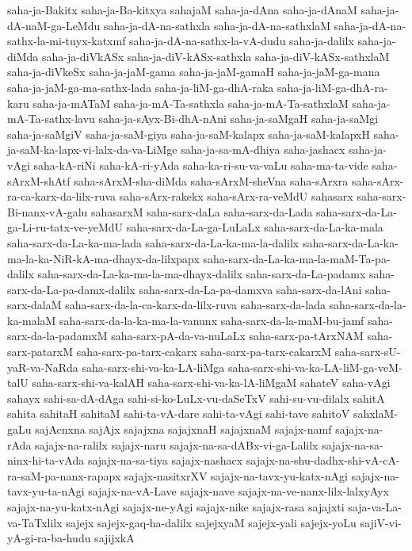 {saha-ja-Bakitx
saha-ja-Ba-kitxya
sahajaM
saha-ja-dAna
saha-ja-dAnaM
saha-ja-dA-naM-ga-LeMdu
saha-ja-dA-na-sathxla
saha-ja-dA-na-sathxlaM
saha-ja-dA-na-sathx-la-mi-tuyx-katxmf
saha-ja-dA-na-sathx-la-vA-dudu
saha-ja-dalilx
saha-ja-diMda
saha-ja-diVkASx
saha-ja-diV-kASx-sathxla
saha-ja-diV-kASx-sathxlaM
saha-ja-diVkeSx
saha-ja-jaM-gama
saha-ja-jaM-gamaH
saha-ja-jaM-ga-mana
saha-ja-jaM-ga-ma-sathx-lada
saha-ja-liM-ga-dhA-raka
saha-ja-liM-ga-dhA-ra-karu
saha-ja-mATaM
saha-ja-mA-Ta-sathxla
saha-ja-mA-Ta-sathxlaM
saha-ja-mA-Ta-sathx-lavu
saha-ja-sAyx-Bi-dhA-nAni
saha-ja-saMgaH
saha-ja-saMgi
saha-ja-saMgiV
saha-ja-saM-giya
saha-ja-saM-kalapx
saha-ja-saM-kalapxH
saha-ja-saM-ka-lapx-vi-lalx-da-va-LiMge
saha-ja-sa-mA-dhiya
saha-jashacx
saha-ja-vAgi
saha-kA-riNi
saha-kA-ri-yAda
saha-ka-ri-su-va-vaLu
saha-ma-ta-vide
saha-sArxM-shAtf
saha-sArxM-sha-diMda
saha-sArxM-sheVna
saha-sArxra
saha-sArx-ra-ca-karx-da-lilx-ruva
saha-sArx-rakekx
saha-sArx-ra-veMdU
sahasarx
saha-sarx-Bi-nanx-vA-galu
sahasarxM
saha-sarx-daLa
saha-sarx-da-Lada
saha-sarx-da-La-ga-Li-ru-tatx-ve-yeMdU
saha-sarx-da-La-ga-LuLaLx
saha-sarx-da-La-ka-mala
saha-sarx-da-La-ka-ma-lada
saha-sarx-da-La-ka-ma-la-dalilx
saha-sarx-da-La-ka-ma-la-ka-NiR-kA-ma-dhayx-da-lilxpapx
saha-sarx-da-La-ka-ma-la-maM-Ta-pa-dalilx
saha-sarx-da-La-ka-ma-la-ma-dhayx-dalilx
saha-sarx-da-La-padamx
saha-sarx-da-La-pa-damx-dalilx
saha-sarx-da-La-pa-damxva
saha-sarx-da-lAni
saha-sarx-dalaM
saha-sarx-da-la-ca-karx-da-lilx-ruva
saha-sarx-da-lada
saha-sarx-da-la-ka-malaM
saha-sarx-da-la-ka-ma-la-vanunx
saha-sarx-da-la-maM-bu-jamf
saha-sarx-da-la-padamxM
saha-sarx-pA-da-va-nuLaLx
saha-sarx-pa-tArxNAM
saha-sarx-patarxM
saha-sarx-pa-tarx-cakarx
saha-sarx-pa-tarx-cakarxM
saha-sarx-sU-yaR-va-NaRda
saha-sarx-shi-va-ka-LA-liMga
saha-sarx-shi-va-ka-LA-liM-ga-veM-talU
saha-sarx-shi-va-kalAH
saha-sarx-shi-va-ka-lA-liMgaM
sahateV
saha-vAgi
sahayx
sahi-sa-dA-dAga
sahi-si-ko-LuLx-vu-daSeTxV
sahi-su-vu-dilalx
sahitA
sahita
sahitaH
sahitaM
sahi-ta-vA-dare
sahi-ta-vAgi
sahi-tave
sahitoV
sahxlaM-gaLu
sajAcnxna
sajAjx
sajajxna
sajajxnaH
sajajxnaM
sajajx-namf
sajajx-na-rAda
sajajx-na-ralilx
sajajx-naru
sajajx-na-sa-dABx-vi-ga-Lalilx
sajajx-na-sa-ninx-hi-ta-vAda
sajajx-na-sa-tiya
sajajx-nashacx
sajajx-na-shu-dadhx-shi-vA-cA-ra-saM-pa-nanx-rapapx
sajajx-nasitxrXV
sajajx-na-tavx-yu-katx-nAgi
sajajx-na-tavx-yu-ta-nAgi
sajajx-na-vA-Lave
sajajx-nave
sajajx-na-ve-nanx-lilx-lalxyAyx
sajajx-na-yu-katx-nAgi
sajajx-ne-yAgi
sajajx-nike
sajajx-rasa
sajajxti
saja-va-La-va-TaTxlilx
sajejx
sajejx-gaq-ha-dalilx
sajejxyaM
sajejx-yali
sajejx-yoLu
sajiV-vi-yA-gi-ra-ba-hudu
sajijxkA
}
